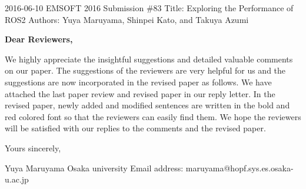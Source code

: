 \documentclass{article}
\begin{document}
\begin{flushleft}
  2016-06-10\newline
  EMSOFT 2016 Submission \#83\newline
  Title: Exploring the Performance of ROS2\newline
  Authors: Yuya Maruyama, Shinpei Kato, and Takuya Azumi\newline
\end{flushleft}
\textbf{Dear Reviewers,}\newline

We highly appreciate the insightful suggestions and detailed valuable comments on our paper. The suggestions of the reviewers are very helpful for us and the suggestions are now incorporated in the revised paper as follows. We have attached the last paper review and revised paper in our reply letter. In the revised paper, newly added and modified sentences are written in the bold and red colored font so that the reviewers can easily find them. We hope the reviewers will be satisfied with our replies to the comments and the revised paper.\newline\newline

\begin{flushleft}
  Yours sincerely,\newline

  Yuya Maruyama\newline
  Osaka university\newline
  Email address: maruyama@hopf.sys.es.osaka-u.ac.jp\newline
\end{flushleft}

\clearpage




\end{document}
